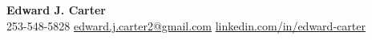 \begin{center}
	{\LARGE \textbf{Edward J. Carter}} \\
	\small
	253-548-5828 \;\textbar\;
	\href{mailto:edward.j.carter2@gmail.com}{edward.j.carter2@gmail.com} \;\textbar\;
	\href{https://linkedin.com/in/edward-carter}{linkedin.com/in/edward-carter}
\end{center}
\vspace{-0.6em}